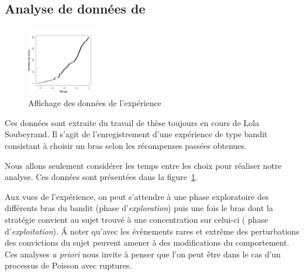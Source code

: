 \documentclass[a4paper,10pt]{article}\usepackage[]{graphicx}\usepackage[]{xcolor}
\newenvironment{knitrout}{}{} %
\begin{document}
\subsection*{Analyse de données de \cite{soubeyrandDonneesTheseExperience2024}}


\begin{figure}
    \centering
\begin{knitrout}
\color{fgcolor}
\includegraphics[width=0.27\textwidth,height=0.2\textheight]{figure/plot-soub-1} 
\end{knitrout}
    \vspace{-15pt}
    \caption{Affichage des données de l'expérience}
    \label{fig:donnees-soub}
\end{figure}

Ces données sont extraite du travail de thèse toujours en cours de Lola 
Soubeyrand. Il s'agit de l'enregistrement d'une expérience de type bandit 
consistant à choisir un bras selon les récompenses passées obtenues.

Nous allons seulement considérer les temps entre les choix pour réaliser notre 
analyse. Ces données sont présentées dans la figure~\ref{fig:donnees-soub}.

Aux vues de l'expérience, on peut s'attendre à une phase exploratoire des 
différents bras du bandit (phase d'\emph{exploration}) puis une fois le bras 
dont la stratégie convient au sujet trouvé à une concentration sur celui-ci (
phase d'\emph{exploitation}). Á noter qu'avec les évènements rares et extrême
des perturbations des convictions du sujet peuvent amener à des modifications du
comportement. Ces analyses \emph{a priori} nous invite à penser que l'on peut 
être dans le cas d'un processus de Poisson avec ruptures.
\end{document}
